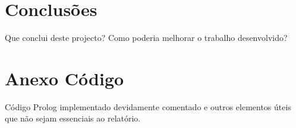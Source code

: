 \documentclass[a4paper]{article}
\begin{document}
\section{Conclusões}
Que conclui deste projecto? Como poderia melhorar o trabalho desenvolvido?


\clearpage
{}
\renewcommand\refname{Bibliografia}



\newpage
\appendix
\section{Anexo Código}
Código Prolog implementado devidamente comentado e outros elementos úteis que não sejam essenciais ao relatório.
\end{document}
